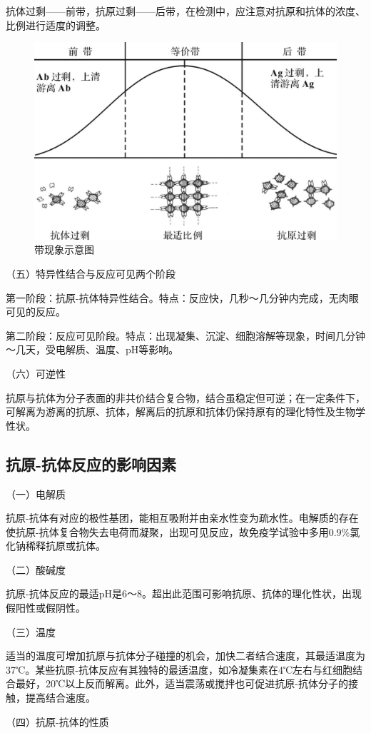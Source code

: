 抗体过剩------前带，抗原过剩------后带，在检测中，应注意对抗原和抗体的浓度、比例进行适度的调整。

\begin{figure}[!htbp]
 \centering
 \includegraphics[width=.6\textwidth]{./images/Image00152.jpg}
 \captionsetup{justification=centering}
 \caption{带现象示意图}
 \label{fig10-1}
  \end{figure} 

（五）特异性结合与反应可见两个阶段

第一阶段：抗原-抗体特异性结合。特点：反应快，几秒～几分钟内完成，无肉眼可见的反应。

第二阶段：反应可见阶段。特点：出现凝集、沉淀、细胞溶解等现象，时间几分钟～几天，受电解质、温度、pH等影响。

（六）可逆性

抗原与抗体为分子表面的非共价结合复合物，结合虽稳定但可逆；在一定条件下，可解离为游离的抗原、抗体，解离后的抗原和抗体仍保持原有的理化特性及生物学性状。


\subsection{抗原-抗体反应的影响因素}

（一）电解质

抗原-抗体有对应的极性基团，能相互吸附并由亲水性变为疏水性。电解质的存在使抗原-抗体复合物失去电荷而凝聚，出现可见反应，故免疫学试验中多用0.9\%氯化钠稀释抗原或抗体。

（二）酸碱度

抗原-抗体反应的最适pH是6～8。超出此范围可影响抗原、抗体的理化性状，出现假阳性或假阴性。

（三）温度

适当的温度可增加抗原与抗体分子碰撞的机会，加快二者结合速度，其最适温度为37℃。某些抗原-抗体反应有其独特的最适温度，如冷凝集素在4℃左右与红细胞结合最好，20℃以上反而解离。此外，适当震荡或搅拌也可促进抗原-抗体分子的接触，提高结合速度。

（四）抗原-抗体的性质

